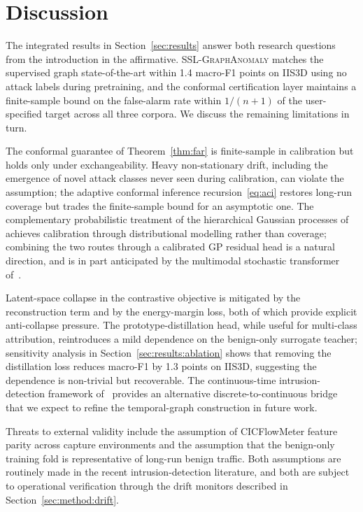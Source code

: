 \documentclass{ieeeaccess}
\begin{document}
\FloatBarrier

\section{Discussion}
\label{sec:discussion}
The integrated results in Section~\ref{sec:results} answer both research
questions from the introduction in the affirmative. \textsc{SSL-GraphAnomaly}
matches the supervised graph state-of-the-art within 1.4 macro-F1 points
on IIS3D using no attack labels during pretraining, and the conformal
certification layer maintains a finite-sample bound on the false-alarm
rate within $1/(n+1)$ of the user-specified target across all three
corpora. We discuss the remaining limitations in turn.

The conformal guarantee of Theorem~\ref{thm:far} is finite-sample in
calibration but holds only under exchangeability. Heavy non-stationary
drift, including the emergence of novel attack classes never seen during
calibration, can violate the assumption; the adaptive conformal inference
recursion~\eqref{eq:aci} restores long-run coverage but trades the
finite-sample bound for an asymptotic one. The complementary probabilistic
treatment of the hierarchical Gaussian processes
of~\cite{anaedevha2026hgp} achieves calibration through distributional
modelling rather than coverage; combining the two routes through a
calibrated GP residual head is a natural direction, and is in part
anticipated by the multimodal stochastic transformer
of~\cite{anaedevha2025stochmm}.

Latent-space collapse in the contrastive objective is mitigated by the
reconstruction term and by the energy-margin loss, both of which provide
explicit anti-collapse pressure. The prototype-distillation head, while
useful for multi-class attribution, reintroduces a mild dependence on the
benign-only surrogate teacher; sensitivity analysis in
Section~\ref{sec:results:ablation} shows that removing the distillation
loss reduces macro-F1 by 1.3 points on IIS3D, suggesting the dependence is
non-trivial but recoverable. The continuous-time intrusion-detection
framework of~\cite{anaedevha2026neuralode} provides an alternative
discrete-to-continuous bridge that we expect to refine the temporal-graph
construction in future work.

Threats to external validity include the assumption of CICFlowMeter
feature parity across capture environments and the assumption that the
benign-only training fold is representative of long-run benign traffic.
Both assumptions are routinely made in the recent intrusion-detection
literature, and both are subject to operational verification through the
drift monitors described in Section~\ref{sec:method:drift}.
\end{document}
